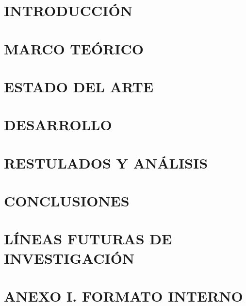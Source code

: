 \documentclass[12pt]{article}
\begin{document}
\clearpage %
\section{INTRODUCCIÓN} 



\clearpage



\newpage
\section{MARCO TEÓRICO} 
    

\newpage
\section{ESTADO DEL ARTE} 
    

\newpage
\section{DESARROLLO} 
    

\newpage
\section{RESTULADOS Y ANÁLISIS} 
    


\newpage
\section{CONCLUSIONES} 
    

\newpage
\section{LÍNEAS FUTURAS DE INVESTIGACIÓN} 
    

\newpage

\printbibliography[title={Bibliografia}]

\newpage
\appendix
\section*{ANEXO I. \quad FORMATO INTERNO} 
    
\end{document}

